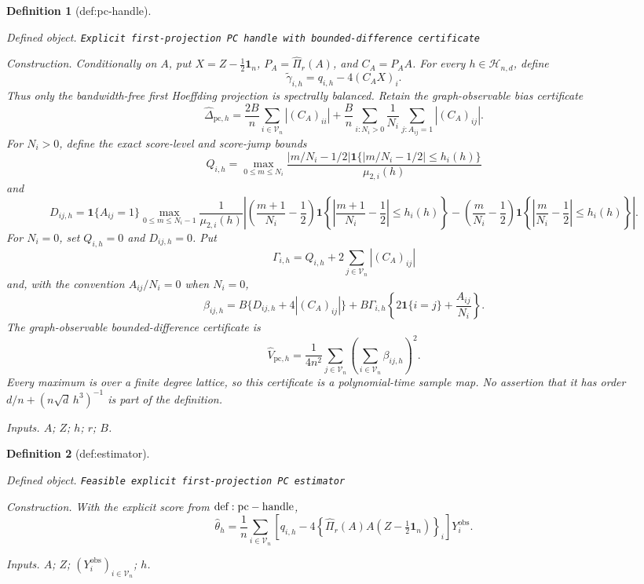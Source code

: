 \documentclass{article}
\newtheorem{definition}{Definition}
\begin{document}
\begin{definition}[def:pc-handle]\label{def:pc-handle}
\par\smallskip\noindent\emph{Defined object.} \texttt{Explicit first-\allowbreak{}projection PC handle with bounded-\allowbreak{}difference certificate}
\par\smallskip\noindent\emph{Construction.} Conditionally on \(A\), put \(X=Z-\tfrac12\mathbf1_n\), \(P_A=\widehat\Pi_r(A)\), and \(C_A=P_AA\).  For every \(h\in\mathcal H_{n,d}\), define
\[
 \widetilde\gamma_{i,h}=q_{i,h}-4(C_AX)_i.
\]
Thus only the bandwidth-free first Hoeffding projection is spectrally balanced.  Retain the graph-observable bias certificate
\[
 \widehat\Delta_{\mathrm{pc},h}
 =\frac{2B}{n}\sum_{i\in\mathcal V_n}|(C_A)_{ii}|
 +\frac{B}{n}\sum_{i:N_i>0}\frac1{N_i}
       \sum_{j:A_{ij}=1}|(C_A)_{ij}|.
\]
For \(N_i>0\), define the exact score-level and score-jump bounds
\[
 Q_{i,h}=\max_{0\le m\le N_i}
 \frac{|m/N_i-1/2|\mathbf1\{|m/N_i-1/2|\le h_i(h)\}}
      {\mu_{2,i}(h)}
\]
and
\[
 D_{ij,h}=\mathbf1\{A_{ij}=1\}
 \max_{0\le m\le N_i-1}\frac1{\mu_{2,i}(h)}
 \left|
 \left(\frac{m+1}{N_i}-\frac12\right)
 \mathbf1\!\left\{\left|\frac{m+1}{N_i}-\frac12\right|\le h_i(h)\right\}
 -\left(\frac m{N_i}-\frac12\right)
 \mathbf1\!\left\{\left|\frac m{N_i}-\frac12\right|\le h_i(h)\right\}
 \right|.
\]
For \(N_i=0\), set \(Q_{i,h}=0\) and \(D_{ij,h}=0\).  Put
\[
 \Gamma_{i,h}=Q_{i,h}+2\sum_{j\in\mathcal V_n}|(C_A)_{ij}|
\]
and, with the convention \(A_{ij}/N_i=0\) when \(N_i=0\),
\[
 \beta_{ij,h}
 =B\{D_{ij,h}+4|(C_A)_{ij}|\}
 +B\Gamma_{i,h}
 \left\{2\mathbf1\{i=j\}+\frac{A_{ij}}{N_i}\right\}.
\]
The graph-observable bounded-difference certificate is
\[
 \widehat V_{\mathrm{pc},h}
 =\frac1{4n^2}\sum_{j\in\mathcal V_n}
       \left(\sum_{i\in\mathcal V_n}\beta_{ij,h}\right)^2.
\]
Every maximum is over a finite degree lattice, so this certificate is a polynomial-time sample map.  No assertion that it has order \(d/n+(n\sqrt d\,h^3)^{-1}\) is part of the definition.
\par\smallskip\noindent\emph{Inputs.} \(A\); \(Z\); \(h\); \(r\); \(B\).
\end{definition}

\begin{definition}[def:estimator]\label{def:estimator}
\par\smallskip\noindent\emph{Defined object.} \texttt{Feasible explicit first-\allowbreak{}projection PC estimator}
\par\smallskip\noindent\emph{Construction.} With the explicit score from \({\rm def:pc-handle}\),
\[
 \widehat\theta_h
 =\frac1n\sum_{i\in\mathcal V_n}
 \left[q_{i,h}-4\left\{\widehat\Pi_r(A)A
       (Z-\tfrac12\mathbf1_n)\right\}_i\right]Y_i^{\mathrm{obs}}.
\]
\par\smallskip\noindent\emph{Inputs.} \(A\); \(Z\); \((Y_i^{\mathrm{obs}})_{i\in\mathcal V_n}\); \(h\).
\end{definition}
\end{document}
